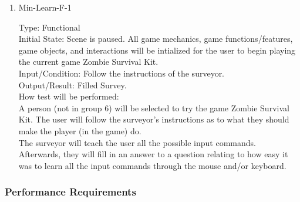 \documentclass[12pt, titlepage]{article}
\newcounter{ftnum}
\newcounter{nftnum}
\begin{document}
\begin{enumerate}
	
	\item{Min-Learn-F-1\\}  \label{NF4}
	
	Type: Functional \\
	
	Initial State: Scene is paused. All game mechanics, game functions/features, game objects, and interactions will be intialized for the user to begin playing the current game Zombie Survival Kit. \\
	
	Input/Condition: Follow the instructions of the surveyor. \\
	
	Output/Result: Filled Survey. \\
	
	How test will be performed:\\ A person (not in group 6) will be selected to try the game Zombie Survival Kit. The user will follow the surveyor's instructions as to what they should make the player (in the game) do. \\
	The surveyor will teach the user all the possible input commands. \\
	Afterwards, they will fill in an answer to a question relating to how easy it was to learn all the input commands through the mouse and/or keyboard.\\				
	
\end{enumerate}

\subsubsection{Performance Requirements}
\end{document}
